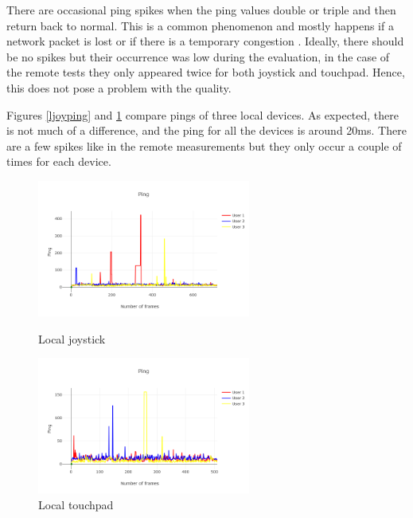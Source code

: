 \documentclass{l4proj}
\begin{document}
There are occasional ping spikes when the ping values double or triple and then return back to normal. This is a common phenomenon and mostly happens if a network packet is lost or if there is a temporary congestion \cite{ping_spike}. Ideally, there should be no spikes but their occurrence was low during the evaluation, in the case of the remote tests they only appeared twice for both joystick and touchpad. Hence, this does not pose a problem with the quality. \par 

Figures \ref{ljoyping} and \ref{ltouchping} compare pings of three local devices. As expected, there is not much of a difference, and the ping for all the devices is around 20ms. There are a few spikes like in the remote measurements but they only occur a couple of times for each device. 



\begin{figure}[h!]
    \centering
    \begin{minipage}{0.45\textwidth}
        \centering
        \includegraphics[width=7cm]{./images/ljoyping.png} %
        \caption{Local joystick}
        \label{ljoyping}
    \end{minipage}\hfill
    \begin{minipage}{0.45\textwidth}
        \centering
        \includegraphics[width=7cm]{./images/ltouchping.png} %
        \caption{Local touchpad}
        \label{ltouchping}
    \end{minipage}
\end{figure}
\end{document}
